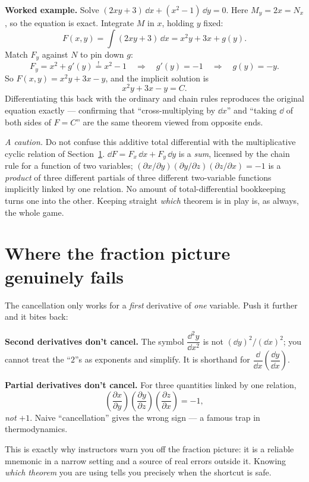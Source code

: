 \documentclass{essay}
\begin{document}
\textbf{Worked example.} Solve \((2xy+3)\,\dd x+(x^{2}-1)\,\dd y=0\). Here
\(M_{y}=2x=N_{x}\), so the equation is exact. Integrate \(M\) in \(x\), holding
\(y\) fixed:
\[ F(x,y) = \int (2xy+3)\,\dd x = x^{2}y+3x+g(y). \]
Match \(F_{y}\) against \(N\) to pin down \(g\):
\[ F_{y} = x^{2}+g'(y) \overset{!}{=} x^{2}-1 \quad\Longrightarrow\quad g'(y)=-1 \quad\Longrightarrow\quad g(y)=-y. \]
So \(F(x,y)=x^{2}y+3x-y\), and the implicit solution is
\[ x^{2}y+3x-y=C. \]
Differentiating this back with the ordinary and chain rules reproduces
the original equation exactly --- confirming that ``cross-multiplying
by \(\dd x\)'' and ``taking \(\dd\) of both sides of \(F=C\)'' are the same
theorem viewed from opposite ends.

\medskip
\textit{A caution.} Do not confuse this additive total differential
with the multiplicative cyclic relation of
Section~\ref{sec:fails}. \(\dd F=F_{x}\,\dd x+F_{y}\,\dd y\) is a
\emph{sum}, licensed by the chain rule for a function of two
variables; \((\partial x/\partial y)(\partial y/\partial
z)(\partial z/\partial x)=-1\) is a \emph{product} of three different
partials of three different two-variable functions implicitly linked
by one relation. No amount of total-differential bookkeeping turns one
into the other. Keeping straight \emph{which} theorem is in play is,
as always, the whole game.

\section{Where the fraction picture genuinely fails}
\label{sec:fails}

The cancellation only works for a \emph{first} derivative of
\emph{one} variable. Push it further and it bites back:

\textbf{Second derivatives don't cancel.} The symbol \(\dfrac{\dd^{2}
y}{\dd x^{2}}\) is not \((\dd y)^{2}/(\dd x)^{2}\); you cannot treat the
``\(2\)''s as exponents and simplify. It is shorthand for
\(\dfrac{\dd}{\dd x}\!\left(\dfrac{\dd y}{\dd x}\right)\).

\medskip
\textbf{Partial derivatives don't cancel.} For three quantities
linked by one relation,
\[ \left(\frac{\partial x}{\partial y}\right)\!\left(\frac{\partial y}{\partial z}\right)\!\left(\frac{\partial z}{\partial x}\right) = -1, \]
\emph{not} \(+1\). Naive ``cancellation'' gives the wrong sign --- a
famous trap in thermodynamics.

This is exactly why instructors warn you off the fraction picture: it
is a reliable mnemonic in a narrow setting and a source of real
errors outside it. Knowing \emph{which theorem} you are using tells
you precisely when the shortcut is safe.
\end{document}
